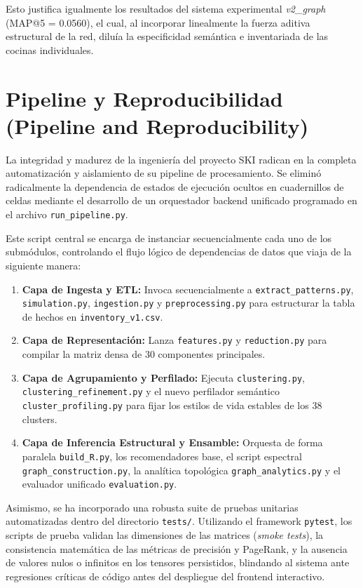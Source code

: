 \documentclass[11pt,a4paper]{article}
\begin{document}
Esto justifica igualmente los resultados del sistema experimental \textit{v2\_graph} (MAP@5 = 0.0560), el cual, al incorporar linealmente la fuerza aditiva estructural de la red, diluía la especificidad semántica e inventariada de las cocinas individuales.

\section{Pipeline y Reproducibilidad (Pipeline and Reproducibility)}
La integridad y madurez de la ingeniería del proyecto SKI radican en la completa automatización y aislamiento de su pipeline de procesamiento. Se eliminó radicalmente la dependencia de estados de ejecución ocultos en cuadernillos de celdas mediante el desarrollo de un orquestador backend unificado programado en el archivo \texttt{run\_pipeline.py}.

Este script central se encarga de instanciar secuencialmente cada uno de los submódulos, controlando el flujo lógico de dependencias de datos que viaja de la siguiente manera:
\begin{enumerate}
    \item \textbf{Capa de Ingesta y ETL:} Invoca secuencialmente a \texttt{extract\_patterns.py}, \texttt{simulation.py}, \texttt{ingestion.py} y \texttt{preprocessing.py} para estructurar la tabla de hechos en \texttt{inventory\_v1.csv}.
    \item \textbf{Capa de Representación:} Lanza \texttt{features.py} y \texttt{reduction.py} para compilar la matriz densa de 30 componentes principales.
    \item \textbf{Capa de Agrupamiento y Perfilado:} Ejecuta \texttt{clustering.py}, \texttt{clustering\_refinement.py} y el nuevo perfilador semántico \texttt{cluster\_profiling.py} para fijar los estilos de vida estables de los 38 clusters.
    \item \textbf{Capa de Inferencia Estructural y Ensamble:} Orquesta de forma paralela \texttt{build\_R.py}, los recomendadores base, el script espectral \texttt{graph\_construction.py}, la analítica topológica \texttt{graph\_analytics.py} y el evaluador unificado \texttt{evaluation.py}.
\end{enumerate}

Asimismo, se ha incorporado una robusta suite de pruebas unitarias automatizadas dentro del directorio \texttt{tests/}. Utilizando el framework \texttt{pytest}, los scripts de prueba validan las dimensiones de las matrices (\textit{smoke tests}), la consistencia matemática de las métricas de precisión y PageRank, y la ausencia de valores nulos o infinitos en los tensores persistidos, blindando al sistema ante regresiones críticas de código antes del despliegue del frontend interactivo.
\end{document}
